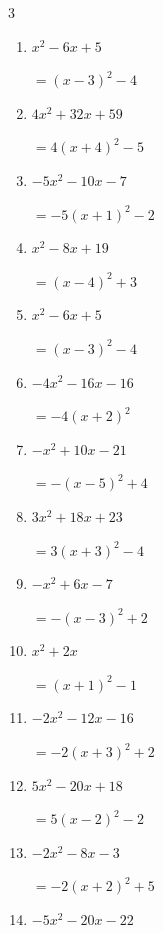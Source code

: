 \begin{multicols}{3}
\begin{enumerate}
  \item $x^{2}-6x+5$

        $=\left( x-3\right)^{2}-4$

\columnbreak %

  \item $4x^{2}+32x+59$

        $=4\left( x+4\right)^{2}-5$

  \item $-5x^{2}-10x-7$

        $=-5\left( x+1\right)^{2}-2$

  \item $x^{2}-8x+19$

        $=\left( x-4\right)^{2}+3$

  \item $x^{2}-6x+5$

        $=\left( x-3\right)^{2}-4$

  \item $-4x^{2}-16x-16$

        $=-4\left( x+2\right)^{2}$

  \item $-x^{2}+10x-21$

        $=-\left( x-5\right)^{2}+4$

  \item $3x^{2}+18x+23$

        $=3\left( x+3\right)^{2}-4$

  \item $-x^{2}+6x-7$

        $=-\left( x-3\right)^{2}+2$

  \item $x^{2}+2x$

        $=\left( x+1\right)^{2}-1$

  \item $-2x^{2}-12x-16$

        $=-2\left( x+3\right)^{2}+2$

\columnbreak %

\resetques

  \item $5x^{2}-20x+18$

        $=5\left( x-2\right)^{2}-2$

  \item $-2x^{2}-8x-3$

        $=-2\left( x+2\right)^{2}+5$

  \item $-5x^{2}-20x-22$


\end{enumerate}
\end{multicols}
